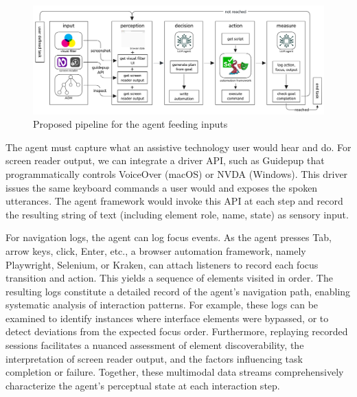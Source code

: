 \begin{figure}
    \centering
    \includegraphics[width=1\linewidth]{imgs/flow.png}
    \caption{Proposed pipeline for the agent feeding inputs}
    \vspace{-13pt}
\label{fig:pipeline}
\end{figure}

The agent must capture what an assistive technology user would hear and do. For screen reader output, we can integrate a driver API, such as Guidepup\cite{guidepup2025} that programmatically controls VoiceOver (macOS)\cite{voiceover2024} or NVDA (Windows)\cite{nvda2024}.
This driver issues the same keyboard commands a user would and exposes the spoken utterances\cite{guidepup2025}. The agent framework would invoke this API at each step and record the resulting string of text (including element role, name, state) as sensory input.


For navigation logs, the agent can log focus events. As the agent presses Tab, arrow keys, click, Enter, etc., a browser automation framework, namely Playwright\cite{playwright2025}, Selenium\cite{garcia2024selenium}, or Kraken\cite{ravelo2023kraken}, can attach listeners to record each focus transition and action. This yields a sequence of elements visited in order\cite{ravelo2023kraken}. 
The resulting logs constitute a detailed record of the agent's navigation path, enabling systematic analysis of interaction patterns. For example, these logs can be examined to identify instances where interface elements were bypassed, or to detect deviations from the expected focus order. Furthermore, replaying recorded sessions facilitates a nuanced assessment of element discoverability, the interpretation of screen reader output, and the factors influencing task completion or failure. Together, these multimodal data streams comprehensively characterize the agent's perceptual state at each interaction step.

